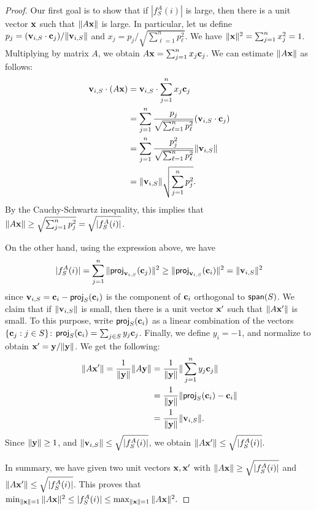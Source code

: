 \documentclass{article}
\theoremstyle{definition}
\begin{document}
\begin{proof}
Our first goal is to show that if $|f^A_S(i)|$  is large, then there is a unit vector $\mathbf x$ such that $\|A\mathbf x\|$ is large. In particular, let us define $p_j = (\mathbf v_{i,S} \cdot \mathbf c_j)/\|\mathbf v_{i,S} \|$ and $x_j = p_j / \sqrt{ \sum_{\ell=1}^{n} p_\ell^2}$. We have $\|\mathbf x\|^2 = \sum_{j=1}^{n} x_j^2 = 1$. Multiplying by matrix $A$, we obtain $A\mathbf x = \sum_{j=1}^{n} x_j \mathbf c_j$. We can estimate $\|A \mathbf x\|$ as follows:
\begin{align*}
 \mathbf v_{i,S} \cdot (A \mathbf x) &= \mathbf v_{i,S} \cdot \sum_{j=1}^{n} x_j \mathbf c_j  \\
&= \sum_{j=1}^{n} \frac{p_j}{\sqrt{\sum_{\ell=1}^{n} p_\ell^2}} (\mathbf v_{i,S} \cdot \mathbf c_j) 
\\ 
&= \sum_{j=1}^{n} \frac{p_j^2}{\sqrt{\sum_{\ell=1}^{n} p_\ell^2}} \|\mathbf v_{i,S}\|  \\
&= \| \mathbf v_{i,S} \| \sqrt{ \sum_{j=1}^{n} p_j^2}.
\end{align*}
By the Cauchy-Schwartz inequality, this implies that $\| A\mathbf x \| \geq \sqrt{ \sum_{j=1}^{n} p_j^2} = \sqrt{ |f^A_S(i)|}$.

On the other hand, using the expression above, we have
\begin{align*}
 |f^A_S(i)| = \sum_{j=1}^{n} \| \mathsf{proj}_{\mathbf v_{i,S}}(\mathbf c_j) \|^2 \geq \| \mathsf{proj}_{\mathbf v_{i,S}}(\mathbf c_i) \|^2 = \| \mathbf v_{i,S} \|^2
\end{align*}
since $\mathbf v_{i,S} = \mathbf c_i - \mathsf{proj}_S(\mathbf c_i)$ is the component of $\mathbf c_i$ orthogonal to $\mathsf{span}(S)$.
We claim that if $\| \mathbf v_{i,S} \|$ is small, then there is a unit vector $\mathbf x'$ such that $\|A\mathbf x'\|$ is small. To this purpose, write $\mathsf{proj}_{S}(\mathbf c_i)$ as a linear combination of the vectors $\{\mathbf c_j: j \in S \}$: $ \mathsf{proj}_{S}(\mathbf c_i) = \sum_{j \in S} y_j \mathbf c_j$. Finally, we define $y_i = -1$, and normalize to obtain $\mathbf x' = \mathbf y / \| \mathbf y \|$.
We get the following:
\begin{align*}
\| A \mathbf x' \| = \frac{1}{\| \mathbf y \|} \| A \mathbf y \| &= \frac{1}{\| \mathbf y \|}  \| \sum_{j=1}^{n} y_j \mathbf c_j \| \\
&= \frac{1}{\| \mathbf y \|} \| \mathsf{proj}_{S}(\mathbf c_i) - \mathbf c_i \| \\
&= \frac{1}{\| \mathbf y \|} \| \mathbf v_{i,S} \|.
\end{align*}
Since $\| \mathbf y \| \geq 1$, and $\| \mathbf v_{i,S} \| \leq \sqrt{|f^A_{S}(i)|}$, we obtain $\|A \mathbf x' \| \leq \sqrt{|f^A_{S}(i)|}$.

In summary, we have given two unit vectors $\mathbf x, \mathbf x'$ with $\|A \mathbf x \| \geq \sqrt{|f^A_{S}(i)|}$ and $\|A \mathbf x' \| \leq \sqrt{|f^A_{S}(i)|}$.
This proves that $ \min_{\|\mathbf x\|=1} \|A\mathbf x\|^2 \leq  |f^A_S(i)| \leq \max_{\|\mathbf x\|=1} \|A\mathbf x\|^2.$
\end{proof}
\end{document}

